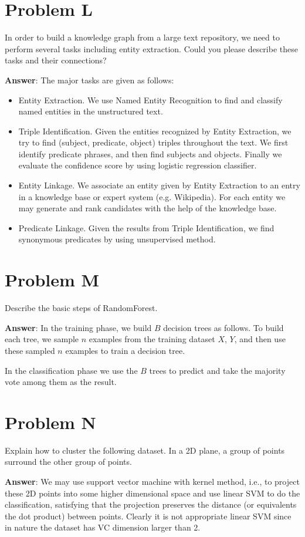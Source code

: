 \documentclass{article}
\begin{document}
\section{Problem L}
In order to build a knowledge graph from a large text repository, we need to perform several tasks including entity extraction. Could you please describe these tasks and their connections?

{\bf Answer}:
The major tasks are given as follows:
\begin{itemize}
\item Entity Extraction. We use Named Entity Recognition to find and classify named entities in the unstructured text.
\item Triple Identification. Given the entities recognized by Entity Extraction, we try to find (subject, predicate, object) triples throughout the text. We first identify predicate phrases, and then find subjects and objects. Finally we evaluate the confidence score by using logistic regression classifier.
\item Entity Linkage. We associate an entity given by Entity Extraction to an entry in a knowledge base or expert system (e.g. Wikipedia). For each entity we may generate and rank candidates with the help of the knowledge base.
\item Predicate Linkage. Given the results from Triple Identification, we find synonymous predicates by using unsupervised method.
\end{itemize}

\section{Problem M}
Describe the basic steps of RandomForest.

{\bf Answer}:
In the training phase, we build $B$ decision trees as follows. To build each tree, we sample $n$ examples from the training dataset $X$, $Y$, and then use these sampled $n$ examples to train a decision tree.

In the classification phase we use the $B$ trees to predict and take the majority vote among them as the result.

\section{Problem N}
Explain how to cluster the following dataset. In a 2D plane, a group of points surround the other group of points.

{\bf Answer}:
We may use support vector machine with kernel method, i.e., to project these 2D points into some higher dimensional space and use linear SVM to do the classification, satisfying that the projection preserves the distance (or equivalents the dot product) between points. Clearly it is not appropriate linear SVM since in nature the dataset has VC dimension larger than 2.
\end{document}
